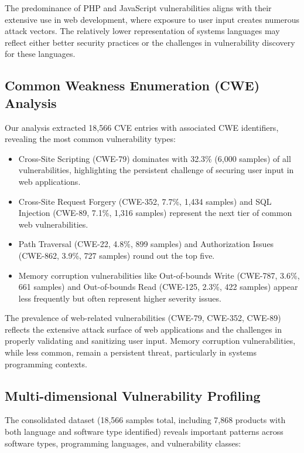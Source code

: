 The predominance of PHP and JavaScript vulnerabilities aligns with their extensive use in web development, where exposure to user input creates numerous attack vectors. The relatively lower representation of systems languages may reflect either better security practices or the challenges in vulnerability discovery for these languages.

\subsection{Common Weakness Enumeration (CWE) Analysis}

Our analysis extracted 18,566 CVE entries with associated CWE identifiers, revealing the most common vulnerability types:

\begin{itemize}
    \item Cross-Site Scripting (CWE-79) dominates with 32.3\% (6,000 samples) of all vulnerabilities, highlighting the persistent challenge of securing user input in web applications.
    \item Cross-Site Request Forgery (CWE-352, 7.7\%, 1,434 samples) and SQL Injection (CWE-89, 7.1\%, 1,316 samples) represent the next tier of common web vulnerabilities.
    \item Path Traversal (CWE-22, 4.8\%, 899 samples) and Authorization Issues (CWE-862, 3.9\%, 727 samples) round out the top five.
    \item Memory corruption vulnerabilities like Out-of-bounds Write (CWE-787, 3.6\%, 661 samples) and Out-of-bounds Read (CWE-125, 2.3\%, 422 samples) appear less frequently but often represent higher severity issues.
\end{itemize}

The prevalence of web-related vulnerabilities (CWE-79, CWE-352, CWE-89) reflects the extensive attack surface of web applications and the challenges in properly validating and sanitizing user input. Memory corruption vulnerabilities, while less common, remain a persistent threat, particularly in systems programming contexts.

\subsection{Multi-dimensional Vulnerability Profiling}

The consolidated dataset (18,566 samples total, including 7,868 products with both language and software type identified) reveals important patterns across software types, programming languages, and vulnerability classes:

